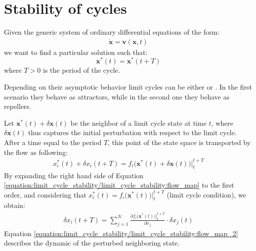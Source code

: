 \documentclass[letterpaper,10pt,english,openany,oneside]{sphinxmanual}
\begin{document}
\section{Stability of cycles}
\label{\detokenize{limit_cycle_stability/limit_cycle_stability:stability-of-cycles}}\label{\detokenize{limit_cycle_stability/limit_cycle_stability::doc}}
Given the generic system of ordinary differential equations of the form:
\begin{equation}\label{equation:limit_cycle_stability/limit_cycle_stability:odes}
\begin{split}\dot{\mathbf{x}} = \mathbf{v}(\mathbf{x}, t)\end{split}
\end{equation}
we want to find a particular solution such that:
\begin{equation}
\mathbf{x}^{*}(t) = \mathbf{x}^{*}(t + T)
\end{equation}
where \(T > 0\) is the period of the cycle.

\begin{figure}[htbp]
\centering

\noindent{}
\end{figure}

Depending on their asymptotic behavior limit cycles can be either  or . In the first scenario they behave as attractors, while in the second one they behave as repellers.

Let  \(\textbf{x}^*(t) + \delta\textbf{x}(t)\) be the neighbor of a limit cycle state at time \(t\), where \(\delta\textbf{x}(t)\) thus captures the initial perturbation with respect to the limit cycle. After a time equal to the period \(T\), this point of the state space is transported by the flow as following:
\begin{equation}\label{equation:limit_cycle_stability/limit_cycle_stability:flow_map}
\begin{split}x_{i}^{*}(t) + \delta{x}_{i}(t+T) = f_{i}\big(\textbf{x}^*(t) + \delta\textbf{x}(t)\big) \Big \rvert_{t}^{t+T}\end{split}
\end{equation}
By expanding the right hand side of Equation \eqref{equation:limit_cycle_stability/limit_cycle_stability:flow_map} to the first order, and considering that \(x_{i}^{*}(t) = f_{i}\big(\textbf{x}^*(t)\big) \big \rvert_{t}^{t+T}\) (limit cycle condition), we obtain:
\begin{equation}\label{equation:limit_cycle_stability/limit_cycle_stability:flow_map_2}
\begin{split}\delta{x}_{i}(t+T) = \sum_{j = 1}^{N} \frac{\partial f_{i}\big(\textbf{x}^*(t)\big) \big \rvert_{t}^{t+T}}{\partial x_{j}}\cdot \delta x_j(t)\end{split}
\end{equation}
Equation \eqref{equation:limit_cycle_stability/limit_cycle_stability:flow_map_2} describes the dynamic of the perturbed neighboring state.
\end{document}
